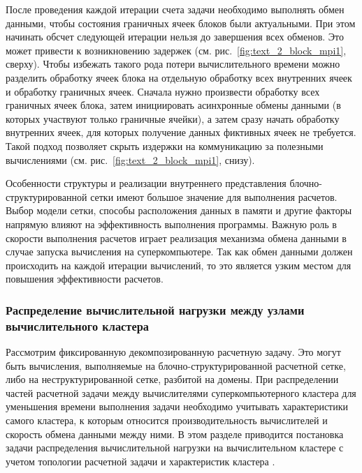 После проведения каждой итерации счета задачи необходимо выполнять обмен данными, чтобы состояния граничных ячеек блоков были актуальными.
При этом начинать обсчет следующей итерации нельзя до завершения всех обменов.
Это может привести к возникновению задержек (см. рис.~\ref{fig:text_2_block_mpi1}, сверху).
Чтобы избежать такого рода потери вычислительного времени можно разделить обработку ячеек блока на отдельную обработку всех внутренних ячеек и обработку граничных ячеек.
Сначала нужно произвести обработку всех граничных ячеек блока, затем инициировать асинхронные обмены данными (в которых участвуют только граничные ячейки), а затем сразу начать обработку внутренних ячеек, для которых получение данных фиктивных ячеек не требуется.
Такой подход позволяет скрыть издержки на коммуникацию за полезными вычислениями (см. рис.~\ref{fig:text_2_block_mpi1}, снизу).

Особенности структуры и реализации внутреннего представления блочно-структурированной сетки имеют большое значение для выполнения расчетов.
Выбор модели сетки, способы расположения данных в памяти и другие факторы напрямую влияют на эффективность выполнения программы.
Важную роль в скорости выполнения расчетов играет реализация механизма обмена данными в случае запуска вычисления на суперкомпьютере.
Так как обмен данными должен происходить на каждой итерации вычислений, то это является узким местом для повышения эффективности расчетов.

\subsubsection{Распределение вычислительной нагрузки между узлами \mbox{вычислительного} кластера}\label{sec:text_2_getero}

Рассмотрим фиксированную декомпозированную расчетную задачу.
Это могут быть вычисления, выполняемые на блочно-структурированной расчетной сетке, либо на неструктурированной сетке, разбитой на домены.
При распределении частей расчетной задачи между вычислителями суперкомпьютерного кластера для уменьшения времени выполнения задачи необходимо учитывать характеристики самого кластера, к которым относится производительность вычислителей и скорость обмена данными между ними.
В этом разделе приводится постановка задачи распределения вычислительной нагрузки на вычислительном кластере с учетом топологии расчетной задачи и характеристик кластера \cite{Rybakov2018Distr,Rybakov2017Part}.

